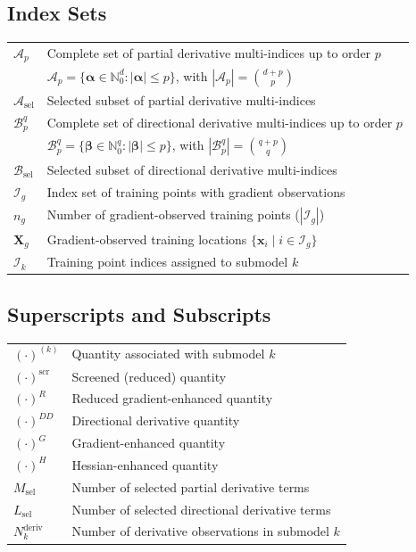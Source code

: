 \documentclass[12pt]{article}
\begin{document}
	\subsection*{Index Sets}
	\begin{tabular}{@{}l l@{}}
		$\mathcal{A}_p$ & Complete set of partial derivative multi-indices up to order $p$ \\
		& $\mathcal{A}_p = \{\boldsymbol{\alpha} \in \mathbb{N}_0^d : |\boldsymbol{\alpha}| \leq p\}$, with $|\mathcal{A}_p| = \binom{d+p}{p}$ \\
		$\mathcal{A}_{\text{sel}}$ & Selected subset of partial derivative multi-indices \\
		$\mathcal{B}_p^q$ & Complete set of directional derivative multi-indices up to order $p$ \\
		& $\mathcal{B}_p^q = \{\boldsymbol{\beta} \in \mathbb{N}_0^q : |\boldsymbol{\beta}| \leq p\}$, with $|\mathcal{B}_p^q| = \binom{q+p}{q}$ \\
		$\mathcal{B}_{\text{sel}}$ & Selected subset of directional derivative multi-indices \\
		$\mathcal{I}_g$ & Index set of training points with gradient observations \\
		$n_g$ & Number of gradient-observed training points ($|\mathcal{I}_g|$) \\
		$\mathbf{X}_g$ & Gradient-observed training locations $\{\mathbf{x}_i \mid i \in \mathcal{I}_g\}$ \\
		$\mathcal{I}_k$ & Training point indices assigned to submodel $k$ \\
	\end{tabular}
	
	\subsection*{Superscripts and Subscripts}
	\begin{tabular}{@{}l l@{}}
		$(\cdot)^{(k)}$ & Quantity associated with submodel $k$ \\
		$(\cdot)^{\text{scr}}$ & Screened (reduced) quantity \\
		$(\cdot)^{R}$ & Reduced gradient-enhanced quantity \\
		$(\cdot)^{DD}$ & Directional derivative quantity \\
		$(\cdot)^{G}$ & Gradient-enhanced quantity \\
		$(\cdot)^{H}$ & Hessian-enhanced quantity \\
		$M_{\text{sel}}$ & Number of selected partial derivative terms \\
		$L_{\text{sel}}$ & Number of selected directional derivative terms \\
		$N_k^{\text{deriv}}$ & Number of derivative observations in submodel $k$ \\
	\end{tabular}
	
\end{document}
